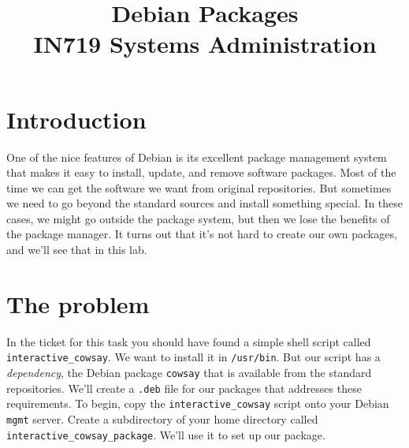 \documentclass{article}
\begin{document}
\title{Debian Packages\\ IN719 Systems Administration}
\date{}
\maketitle

\section{Introduction}
One of the nice features of Debian is its excellent package management system
that makes it easy to install, update, and remove software packages. Most of the time we can get the software we want from original repositories. But 
sometimes we need to go beyond the standard sources and install something 
special. In these cases, we might go outside the package system, but then we 
lose the benefits of the package manager.  It turns out that it's not hard to 
create our own packages, and we'll see that in this lab.  

\section{The problem}
In the ticket for this task you should have found a simple shell script called \texttt{interactive\_cowsay}. We want to
install it in \texttt{/usr/bin}. But our script has a \emph{dependency}, the Debian package \texttt{cowsay} that is available from
the standard repositories. We'll create a \texttt{.deb} file for our packages that addresses these requirements. To
begin, copy the \texttt{interactive\_cowsay} script onto your Debian \texttt{mgmt} server. Create a subdirectory of your home
directory called \texttt{interactive\_cowsay\_package}. We'll use it to set up our package.
\end{document}
